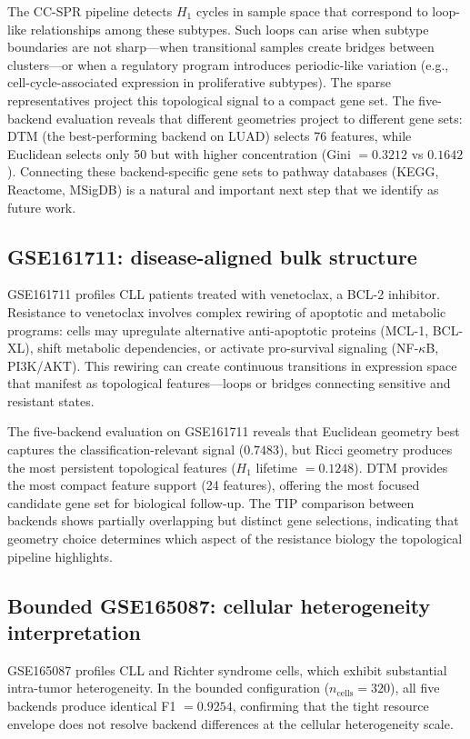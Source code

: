 \documentclass[11pt]{article}
\begin{document}
The CC-SPR pipeline detects $H_1$ cycles in sample space that correspond to loop-like relationships among these subtypes.
Such loops can arise when subtype boundaries are not sharp---when transitional samples create bridges between clusters---or when a regulatory program introduces periodic-like variation (e.g., cell-cycle-associated expression in proliferative subtypes).
The sparse representatives project this topological signal to a compact gene set.
The five-backend evaluation reveals that different geometries project to different gene sets: DTM (the best-performing backend on LUAD) selects 76 features, while Euclidean selects only 50 but with higher concentration (Gini $= 0.3212$ vs $0.1642$).
Connecting these backend-specific gene sets to pathway databases (KEGG, Reactome, MSigDB) is a natural and important next step that we identify as future work.

\subsection{GSE161711: disease-aligned bulk structure}

GSE161711 profiles CLL patients treated with venetoclax, a BCL-2 inhibitor.
Resistance to venetoclax involves complex rewiring of apoptotic and metabolic programs: cells may upregulate alternative anti-apoptotic proteins (MCL-1, BCL-XL), shift metabolic dependencies, or activate pro-survival signaling (NF-$\kappa$B, PI3K/AKT).
This rewiring can create continuous transitions in expression space that manifest as topological features---loops or bridges connecting sensitive and resistant states.

The five-backend evaluation on GSE161711 reveals that Euclidean geometry best captures the classification-relevant signal ($0.7483$), but Ricci geometry produces the most persistent topological features ($H_1$ lifetime $= 0.1248$).
DTM provides the most compact feature support (24 features), offering the most focused candidate gene set for biological follow-up.
The TIP comparison between backends shows partially overlapping but distinct gene selections, indicating that geometry choice determines which aspect of the resistance biology the topological pipeline highlights.

\subsection{Bounded GSE165087: cellular heterogeneity interpretation}

GSE165087 profiles CLL and Richter syndrome cells, which exhibit substantial intra-tumor heterogeneity.
In the bounded configuration ($n_{\text{cells}} = 320$), all five backends produce identical F1 $= 0.9254$, confirming that the tight resource envelope does not resolve backend differences at the cellular heterogeneity scale.
\end{document}
